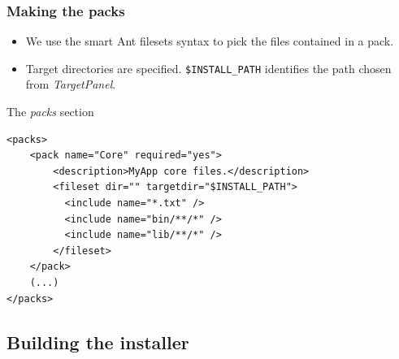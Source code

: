 \documentclass{beamer}
\begin{document}

\begin{frame}[containsverbatim]

\frametitle{Making the packs}

\begin{itemize}

  \item We use the smart Ant filesets syntax to pick the files contained in a
  pack.

  \item Target directories are specified. \alert{\texttt{\small\$INSTALL\_PATH}
  identifies the path chosen from \textsl{TargetPanel}}.

\end{itemize}

\begin{block}{The \textsl{packs} section}
\tiny
\begin{verbatim}
<packs>
    <pack name="Core" required="yes">
        <description>MyApp core files.</description>
        <fileset dir="" targetdir="$INSTALL_PATH">
          <include name="*.txt" />
          <include name="bin/**/*" />
          <include name="lib/**/*" />
        </fileset>
    </pack>
    (...)
</packs>
\end{verbatim}
\end{block}

\end{frame}


\subsection{Building the installer}
\end{document}
